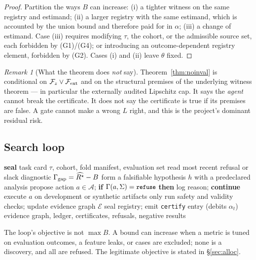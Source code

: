 \documentclass[11pt,a4paper]{article}
\theoremstyle{definition}
\theoremstyle{remark}
\newtheorem{remark}[theorem]{Remark}
\newcommand{\risk}{R^{\star}}
\newcommand{\Fcal}{\mathcal{F}}
\newcommand{\Acal}{\mathcal{A}}
\newcommand{\code}[1]{\texttt{\small#1}}
\begin{document}
\begin{proof}
Partition the ways $B$ can increase: (i) a tighter witness on the same registry and estimand; (ii) a larger registry with the same estimand, which is accounted by the union bound and therefore paid for in $\alpha$; (iii) a change of estimand. Case (iii) requires modifying $\tau$, the cohort, or the admissible source set, each forbidden by (G1)/(G4); or introducing an outcome-dependent registry element, forbidden by (G2). Cases (i) and (ii) leave $\theta$ fixed. \end{proof}

\begin{remark}[What the theorem does \emph{not} say]
Theorem~\ref{thm:noinval} is conditional on $\Fcal_z\vee\Fcal_{\rm ext}$ and on the structural premises of the underlying witness theorem --- in particular the externally audited Lipschitz cap. It says the \emph{agent} cannot break the certificate. It does not say the certificate is true if its premises are false. A gate cannot make a wrong $L$ right, and this is the project's dominant residual risk.
\end{remark}

\subsection{Search loop}

\begin{algorithm}[H]
\caption{Metis gated search (specified, not implemented)}\label{alg:metis}
\begin{algorithmic}[1]
\State \textbf{seal} task card $\tau$, cohort, fold manifest, evaluation set
  \State read most recent refusal or slack diagnostic $\Gamma_{\rm gap}=\widehat{\risk}-B$
  \State form a falsifiable hypothesis $h$ with a predeclared analysis
  \State propose action $a\in\Acal$; \textbf{if} $\Gamma(a,\Sigma)=\code{refuse}$ \textbf{then} log reason; \textbf{continue}
  \State execute $a$ on development or synthetic artifacts only
  \State run safety and validity checks; update evidence graph $\mathcal{E}$
     \State seal registry; emit \code{certify} entry (debits $\alpha_t$)
  \EndIf
\EndWhile
\State \Return evidence graph, ledger, certificates, refusals, negative results
\end{algorithmic}
\end{algorithm}

The loop's objective is not $\max B$. A bound can increase when a metric is tuned on evaluation outcomes, a feature leaks, or cases are excluded; none is a discovery, and all are refused. The legitimate objective is stated in \S\ref{sec:alloc}.
\end{document}
